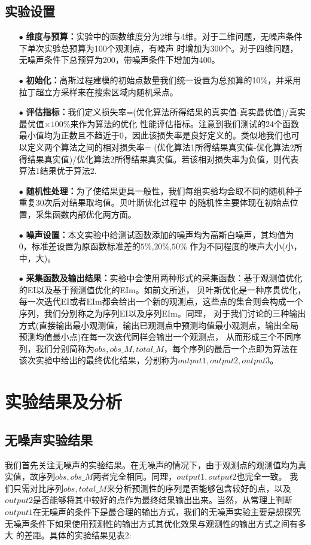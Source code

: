 \documentclass[a4paper,10pt]{article}
\begin{document}
  \subsection{实验设置}
\begin{itemize}
  \item[$\bullet$] \textbf{维度与预算：}实验中的函数维度分为2维与4维。对于二维问题，无噪声条件下单次实验总预算为100个观测点，有噪声
  时增加为300个。对于四维问题，无噪声条件下总预算为200，带噪声条件下增加为400。
  \item[$\bullet$] \textbf{初始化：}高斯过程建模的初始点数量我们统一设置为总预算的10$\%$，并采用拉丁超立方采样来在搜索区域内随机采点。
  \item[$\bullet$] \textbf{评估指标：}我们定义损失率=(优化算法所得结果的真实值-真实最优值)/真实最优值$\times 100\%$来作为算法的优化
  性能评估指标。注意到我们测试的24个函数最小值均为正数且不趋近于0，因此该损失率是良好定义的。类似地我们也可以定义两个算法之间的相对损失率=
  (优化算法1所得结果真实值-优化算法2所得结果真实值)/优化算法2所得结果真实值。若该相对损失率为负值，则代表算法1结果优于算法2.
  \item[$\bullet$] \textbf{随机性处理：}为了使结果更具一般性，我们每组实验均会取不同的随机种子重复30次后对结果取均值。贝叶斯优化过程中
  的随机性主要体现在初始点位置，采集函数内部优化两方面。
  \item[$\bullet$] \textbf{噪声设置：}本文实验中给测试函数添加的噪声均为高斯白噪声，其均值为0，标准差设置为原函数标准差的$5\%$,$20\%$,$50\%$
  作为不同程度的噪声大小(小，中，大)。
  \item[$\bullet$] \textbf{采集函数及输出结果：}实验中会使用两种形式的采集函数：基于观测值优化的EI以及基于预测值优化的EIm。如前文所述，
  贝叶斯优化是一种序贯优化，每一次迭代EI或者EIm都会给出一个新的观测点，这些点的集合则会构成一个序列，我们分别称之为序列EI以及序列EIm。同理，
  对于我们讨论的三种输出方式(直接输出最小观测值，输出已观测点中预测均值最小观测点，输出全局预测均值最小点)在每一次迭代同样会输出一个观测点，
  从而形成三个不同序列，我们分别简称为$obs,obs\_M,total\_M$，每个序列的最后一个点即为算法在该次实验中给出的最终优化结果，分别称为$output1,output2,output3$。
\end{itemize}

\section{实验结果及分析}
  \subsection{无噪声实验结果}
我们首先关注无噪声的实验结果。在无噪声的情况下，由于观测点的观测值均为真实值，故序列$obs,obs\_M$两者完全相同。同理，$output1,output2$也完全一致。
我们只需对比序列$obs,total\_M$来分析预测性的序列是否能够包含较好的点，以及$output2$是否能够将其中较好的点作为最终结果输出出来。当然，从常理上判断
$output1$在无噪声的条件下是最合理的输出方式，我们的无噪声实验主要是想探究无噪声条件下如果使用预测性的输出方式其优化效果与观测性的输出方式之间有多大
的差距。具体的实验结果见表2:
\end{document}
